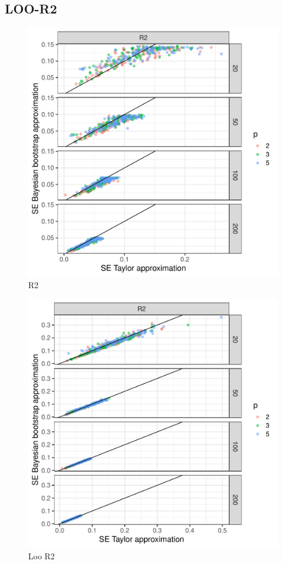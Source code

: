 \documentclass{article}
\begin{document}
\subsection{LOO-R2}

\begin{figure}[!htb]
    \centering
    \includegraphics[width=\textwidth]{figures/r2.pdf}
    \caption{R2}
    \label{fig:r2-plot}
\end{figure}

\begin{figure}[!htb]
    \centering
    \includegraphics[width=\textwidth]{figures/loo_r2.pdf}
    \caption{Loo R2}
    \label{fig:loo-r2-plot}
\end{figure}

\newpage


\end{document}
